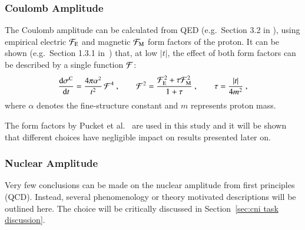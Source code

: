 
\subsubsection{Coulomb Amplitude}
\label{sec:cni coulomb}
%
The Coulomb amplitude can be calculated from QED (e.g.~Section 3.2 in \cite{block06}), using empirical electric ${\cal F}_{\rm E}$ and magnetic ${\cal F}_{\rm M}$ form factors of the proton. It can be shown (e.g.~Section 1.3.1 in~\cite{jan_thesis}) that, at low $|t|$, the effect of both form factors can be described by a single function ${\cal F}$:
\begin{equation}
\label{eq:coul cs}
	{\d\sigma^{\rm C}\over \d t} = {4\pi\alpha^2\over t^2}\,{\cal F}^4\ ,\qquad 
	{\cal F}^2 = {{\cal F}_{\rm E}^2 + \tau {\cal F}_{\rm M}^2\over 1 + \tau}\ ,\qquad 
	\tau = {|t|\over 4m^2}\ ,
\end{equation}
where $\alpha$ denotes the fine-structure constant and $m$ represents proton mass.

The form factors by Pucket et al.~\cite{puckett10} are used in this study and it will be shown that different choices have negligible impact on results presented later on.


\subsubsection{Nuclear Amplitude}
\label{sec:cni nuclear}

Very few conclusions can be made on the nuclear amplitude from first principles (QCD). Instead, several phenomenology or theory motivated descriptions will be outlined here. The choice will be critically discussed in Section~\ref{sec:cni task discussion}.

